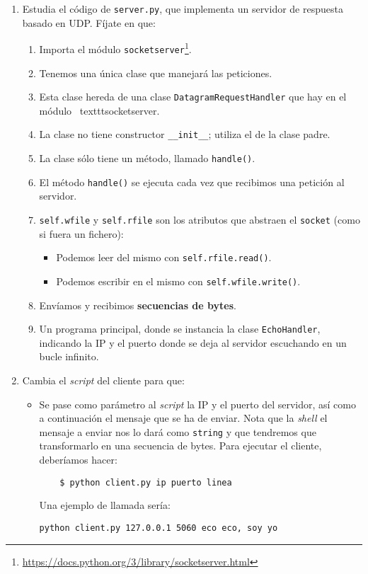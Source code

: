 \documentclass[11pt,a4paper]{article}
\begin{document}
\begin{enumerate}
  \item Estudia el código de \texttt{server.py}, que implementa un servidor de respuesta basado en UDP. Fíjate en que:
  \begin{enumerate}
    \item Importa el módulo \texttt{socketserver}\footnote{\url{https://docs.python.org/3/library/socketserver.html}}.
    \item Tenemos una única clase que manejará las peticiones.
    \item Esta clase hereda de una clase \texttt{DatagramRequestHandler} que hay en el módulo \ texttt{socketserver}.
    \item La clase no tiene constructor \texttt{\_\_init\_\_}; utiliza el de la clase padre.
    \item La clase sólo tiene un método, llamado \texttt{handle()}.
    \item El método \texttt{handle()} se ejecuta cada vez que recibimos una petición al servidor.
    \item \texttt{self.wfile} y \texttt{self.rfile} son los atributos que abstraen el \texttt{socket} (como si fuera un fichero):
    \begin{itemize}
      \item Podemos leer del mismo con \texttt{self.rfile.read()}.
      \item Podemos escribir en el mismo con \texttt{self.wfile.write()}.
    \end{itemize}
    \item Envíamos y recibimos {\bf secuencias de bytes}. 
    \item Un programa principal, donde se instancia la clase \texttt{EchoHandler}, indicando la IP y el puerto donde se deja al servidor escuchando en un bucle infinito.
  \end{enumerate}

  \item Cambia el \emph{script} del cliente para que:
  \begin{itemize}
    \item Se pase como parámetro al \emph{script} la IP y el puerto del servidor, así como a continuación el mensaje que se ha de enviar. Nota que la \emph{shell} el mensaje a enviar nos lo dará como \texttt{string} y que tendremos que transformarlo en una secuencia de bytes. Para ejecutar el cliente, deberíamos hacer:
    \begin{verbatim}
	$ python client.py ip puerto linea
    \end{verbatim}
  Una ejemplo de llamada sería: 
\begin{verbatim}
python client.py 127.0.0.1 5060 eco eco, soy yo
\end{verbatim}
  \end{itemize}


\end{enumerate}
\end{document}
